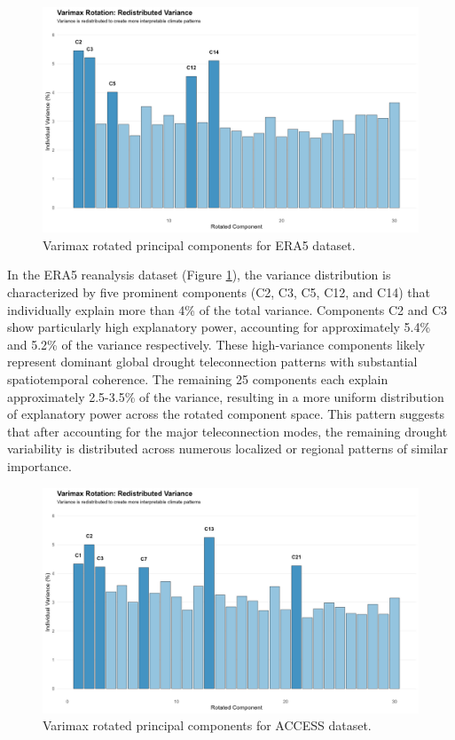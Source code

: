 \documentclass[
]{krantz}
\begin{document}
\begin{figure}

{\centering \includegraphics[width=0.75\linewidth]{work/02-causaldisc/figures/ERA5/varimax_rotation_variance_adjusted_scale} 

}

\caption{Varimax rotated principal components for ERA5 dataset.}\label{fig:figure1}
\end{figure}

In the ERA5 reanalysis dataset (Figure \ref{fig:figure1}), the variance distribution is characterized by five prominent components (C2, C3, C5, C12, and C14) that individually explain more than 4\% of the total variance. Components C2 and C3 show particularly high explanatory power, accounting for approximately 5.4\% and 5.2\% of the variance respectively. These high-variance components likely represent dominant global drought teleconnection patterns with substantial spatiotemporal coherence. The remaining 25 components each explain approximately 2.5-3.5\% of the variance, resulting in a more uniform distribution of explanatory power across the rotated component space. This pattern suggests that after accounting for the major teleconnection modes, the remaining drought variability is distributed across numerous localized or regional patterns of similar importance.

\begin{figure}

{\centering \includegraphics[width=0.75\linewidth]{work/02-causaldisc/figures/ACCESS/varimax_rotation_variance_adjusted_scale} 

}

\caption{Varimax rotated principal components for ACCESS dataset. }\label{fig:figure2}
\end{figure}
\end{document}
